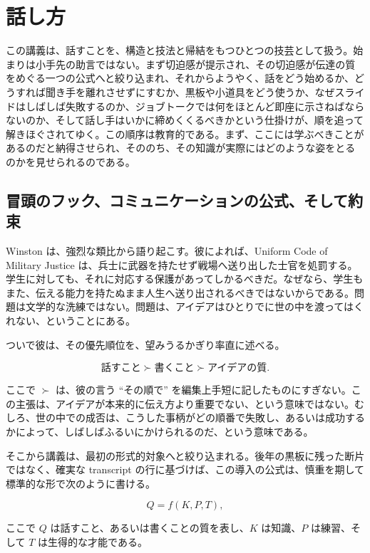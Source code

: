 \chapter{話し方}

この講義は、話すことを、構造と技法と帰結をもつひとつの技芸として扱う。始まりは小手先の助言ではない。まず切迫感が提示され、その切迫感が伝達の質をめぐる一つの公式へと絞り込まれ、それからようやく、話をどう始めるか、どうすれば聞き手を離れさせずにすむか、黒板や小道具をどう使うか、なぜスライドはしばしば失敗するのか、ジョブトークでは何をほとんど即座に示さねばならないのか、そして話し手はいかに締めくくるべきかという仕掛けが、順を追って解きほぐされてゆく。この順序は教育的である。まず、ここには学ぶべきことがあるのだと納得させられ、そののち、その知識が実際にはどのような姿をとるのかを見せられるのである。

\section{冒頭のフック、コミュニケーションの公式、そして約束}

Winston は、強烈な類比から語り起こす。彼によれば、Uniform Code of Military Justice は、兵士に武器を持たせず戦場へ送り出した士官を処罰する。学生に対しても、それに対応する保護があってしかるべきだ。なぜなら、学生もまた、伝える能力を持たぬまま人生へ送り出されるべきではないからである。問題は文学的な洗練ではない。問題は、アイデアはひとりでに世の中を渡ってはくれない、ということにある。

ついで彼は、その優先順位を、望みうるかぎり率直に述べる。

\begin{equation}
\text{話すこと} \succ \text{書くこと} \succ \text{アイデアの質}.
\end{equation}

ここで \(\succ\) は、彼の言う ``その順で'' を編集上手短に記したものにすぎない。この主張は、アイデアが本来的に伝え方より重要でない、という意味ではない。むしろ、世の中での成否は、こうした事柄がどの順番で失敗し、あるいは成功するかによって、しばしばふるいにかけられるのだ、という意味である。

そこから講義は、最初の形式的対象へと絞り込まれる。後年の黒板に残った断片ではなく、確実な transcript の行に基づけば、この導入の公式は、慎重を期して標準的な形で次のように書ける。

\begin{equation}
Q = f(K,P,T),
\end{equation}

ここで \(Q\) は話すこと、あるいは書くことの質を表し、\(K\) は知識、\(P\) は練習、そして \(T\) は生得的な才能である。

